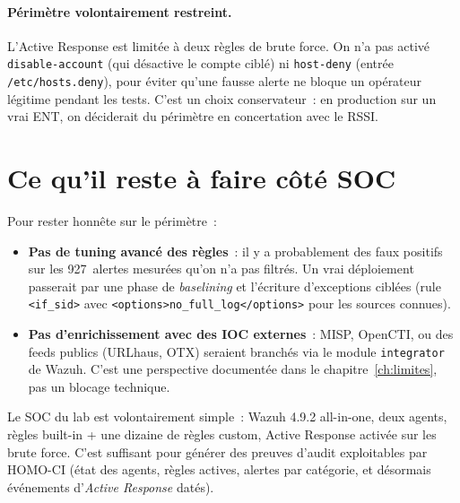 \paragraph{Périmètre volontairement restreint.} L'Active Response
est limitée à deux règles de brute force. On n'a pas activé
\texttt{disable-account} (qui désactive le compte ciblé) ni
\texttt{host-deny} (entrée \texttt{/etc/hosts.deny}), pour
éviter qu'une fausse alerte ne bloque un opérateur légitime
pendant les tests. C'est un choix conservateur~: en production
sur un vrai ENT, on déciderait du périmètre en concertation avec
le RSSI.

\section{Ce qu'il reste à faire côté SOC}

Pour rester honnête sur le périmètre~:

\begin{itemize}
  \item \textbf{Pas de tuning avancé des règles}~: il y a
    probablement des faux positifs sur les 927~alertes mesurées
    qu'on n'a pas filtrés. Un vrai déploiement passerait par une
    phase de \emph{baselining} et l'écriture d'exceptions ciblées
    (rule \texttt{<if\_sid>} avec \texttt{<options>no\_full\_log</options>}
    pour les sources connues).
  \item \textbf{Pas d'enrichissement avec des IOC externes}~:
    MISP, OpenCTI, ou des feeds publics (URLhaus, OTX) seraient
    branchés via le module \texttt{integrator} de Wazuh. C'est
    une perspective documentée dans le chapitre~\ref{ch:limites},
    pas un blocage technique.
\end{itemize}

\begin{takeaway}
Le SOC du lab est volontairement simple~: Wazuh 4.9.2 all-in-one,
deux agents, règles built-in + une dizaine de règles custom,
Active Response activée sur les brute force. C'est suffisant
pour générer des preuves d'audit exploitables par HOMO-CI (état
des agents, règles actives, alertes par catégorie, et désormais
événements d'\emph{Active Response} datés).
\end{takeaway}
